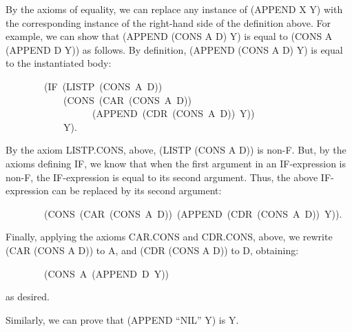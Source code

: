 \documentclass[10pt]{book}
\newenvironment{pubasis}{\begin{flushleft}}{\end{flushleft}}
\begin{document}
By the axioms of equality, we can replace any instance of (APPEND X Y)
with the corresponding instance of the right-hand side of the definition
above.  For example, we can show that (APPEND (CONS A D) Y)
is equal to (CONS A (APPEND D Y)) as follows.  By
definition, (APPEND (CONS A D) Y) is equal to the instantiated body:
\begin{pubasis}
~~~~~~~~(IF~(LISTP~(CONS~A~D))\\
~~~~~~~~~~~~(CONS~(CAR~(CONS~A~D))\\
~~~~~~~~~~~~~~~~~~(APPEND~(CDR~(CONS~A~D))~Y))\\
~~~~~~~~~~~~Y).\\
\end{pubasis}
By the axiom LISTP.CONS, above, (LISTP (CONS A D)) is non-F.
But, by the axioms defining IF, we know
that when the first argument in an IF-expression is non-F, the IF-expression is
equal to its second argument.  Thus, the above IF-expression can be
replaced by its second argument:
\begin{pubasis}
~~~~~~~~(CONS~(CAR~(CONS~A~D))~(APPEND~(CDR~(CONS~A~D))~Y)).\\
\end{pubasis}
Finally, applying the axioms CAR.CONS and CDR.CONS, above, we
rewrite (CAR (CONS A D)) to A, and (CDR (CONS A D)) to D, obtaining:
\begin{pubasis}
~~~~~~~~(CONS~A~(APPEND~D~Y))\\
\end{pubasis}
as desired.

Similarly, we can prove that (APPEND ``NIL'' Y) is Y.
\end{document}
